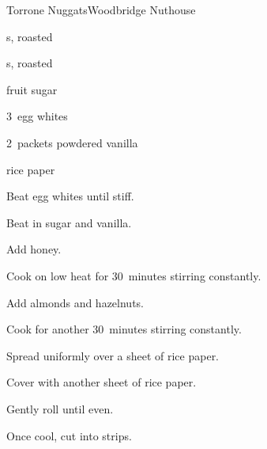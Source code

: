 \begin{recipe}{Torrone Nuggats}{Woodbridge Nuthouse}{}

\begin{ingredients}
\item {} 
\item {} s, roasted
\item {} s, roasted
\item {} fruit sugar
\item 3~egg whites
\item 2~packets powdered vanilla
\item rice paper
\end{ingredients}

\begin{directions}
\item Beat egg whites until stiff.
\item Beat in sugar and vanilla.
\item Add honey.
\item Cook on low heat for 30~minutes stirring constantly.
\item Add almonds and hazelnuts.
\item Cook for another 30~minutes stirring constantly.
\item Spread uniformly over a sheet of rice paper.
\item Cover with another sheet of rice paper.
\item Gently roll until even.
\item Once cool, cut into strips.
\end{directions}

\end{recipe}
